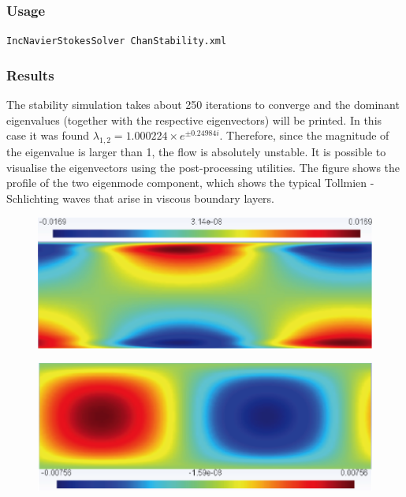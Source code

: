 \subsubsection{Usage}

\texttt{IncNavierStokesSolver ChanStability.xml}


\subsubsection{Results}

The stability simulation takes about 250 iterations to converge and the dominant eigenvalues (together with the respective eigenvectors) will be printed. In this case it was found $    \lambda_{1,2}=1.000224 \times e^{\pm 0.24984i}$. Therefore, since the magnitude of the eigenvalue is larger than 1, the flow is absolutely unstable. It is possible to visualise the eigenvectors using the post-processing utilities. The figure shows the profile of the two eigenmode component, which shows the typical Tollmien - Schlichting waves that arise in viscous boundary layers.

\begin{figure}[!htbp]
\centering
 {\includegraphics[width=1 \textwidth]{Figures/chan_u.png}}
   \caption {}
\end{figure}

\begin{figure}[!htbp]
\centering
 {\includegraphics[width=1 \textwidth]{Figures/chan_v}}
    \caption {}
\end{figure}

